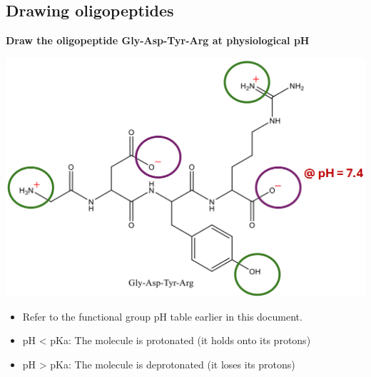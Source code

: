 \documentclass[10pt]{article}
\begin{document}
\subsection*{Drawing oligopeptides}
\textbf{Draw the oligopeptide Gly-Asp-Tyr-Arg at physiological pH}
\begin{center}
    \includegraphics[width=\textwidth]{L2_12.png}
\end{center}
\begin{itemize}
    \item Refer to the functional group pH table earlier in this document.
    \item pH < pKa: The molecule is protonated (it holds onto its protons)
    \item pH > pKa: The molecule is deprotonated (it loses its protons)
\end{itemize}
\end{document}
